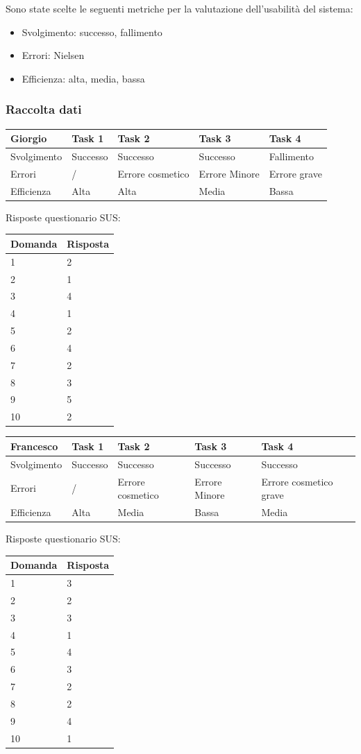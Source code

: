 \documentclass[12pt,italian,]{report}
\begin{document}
Sono state scelte le seguenti metriche per la valutazione dell'usabilità del sistema:

\begin{itemize}
\item
  Svolgimento: successo, fallimento
\item
  Errori: Nielsen
\item
  Efficienza: alta, media, bassa
\end{itemize}

\subsubsection{Raccolta dati}\label{raccolta-dati}

\begin{longtable}[]{@{}lllll@{}}
\toprule
Giorgio & Task 1 & Task 2 & Task 3 & Task 4\tabularnewline
\midrule
\endhead
Svolgimento & Successo & Successo & Successo & Fallimento\tabularnewline
Errori & / & Errore cosmetico & Errore Minore & Errore
grave\tabularnewline
Efficienza & Alta & Alta & Media & Bassa\tabularnewline
\bottomrule
\end{longtable}

Risposte questionario SUS:

\begin{longtable}[]{@{}ll@{}}
\toprule
Domanda & Risposta\tabularnewline
\midrule
\endhead
1 & 2\tabularnewline
2 & 1\tabularnewline
3 & 4\tabularnewline
4 & 1\tabularnewline
5 & 2\tabularnewline
6 & 4\tabularnewline
7 & 2\tabularnewline
8 & 3\tabularnewline
9 & 5\tabularnewline
10 & 2\tabularnewline
\bottomrule
\end{longtable}

\begin{longtable}[]{@{}lllll@{}}
\toprule
Francesco & Task 1 & Task 2 & Task 3 & Task 4\tabularnewline
\midrule
\endhead
Svolgimento & Successo & Successo & Successo & Successo\tabularnewline
Errori & / & Errore cosmetico & Errore Minore & Errore cosmetico
grave\tabularnewline
Efficienza & Alta & Media & Bassa & Media\tabularnewline
\bottomrule
\end{longtable}

Risposte questionario SUS:

\begin{longtable}[]{@{}ll@{}}
\toprule
Domanda & Risposta\tabularnewline
\midrule
\endhead
1 & 3\tabularnewline
2 & 2\tabularnewline
3 & 3\tabularnewline
4 & 1\tabularnewline
5 & 4\tabularnewline
6 & 3\tabularnewline
7 & 2\tabularnewline
8 & 2\tabularnewline
9 & 4\tabularnewline
10 & 1\tabularnewline
\bottomrule
\end{longtable}
\end{document}

